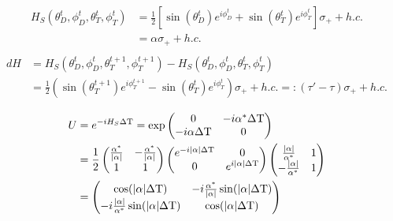 \begin{align*}
	H_S(\theta_D^t, \phi_D^t, \theta_T^t, \phi_T^t) & = \frac{1}{2} \left[\sin(\theta_D^t) e^{i\phi_D^t} + \sin(\theta_T^t) e^{i\phi_T^t}\right] \sigma_{+} + h.c. \\
	& = \alpha \sigma_{+} + h.c. \\
\end{align*}
\begin{align*}
	dH & = H_S(\theta_D^t, \phi_D^t, \theta_T^{t+1}, \phi_T^{t+1}) - H_S(\theta_D^t, \phi_D^t, \theta_T^t, \phi_T^t) \\
	& = \frac{1}{2}(\sin(\theta_T^{t+1})e^{i\phi_T^{t+1}} - \sin(\theta_T^t)e^{i\phi_T^t}) \sigma_{+} + h.c. =: (\tau' - \tau) \sigma_{+} + h.c. \\
\end{align*}
\begin{align*}
	U & = e^{-iH_S \Delta \mathrm{T}} = 
	\exp \begin{pmatrix}
	0 & -i\alpha^* \Delta \mathrm{T} \\
	-i \alpha \Delta \mathrm{T} & 0 \\
	\end{pmatrix}\\
	& = 
	\frac{1}{2} \begin{pmatrix}
	\frac{\alpha^*}{\abs{\alpha}} & -\frac{\alpha^*}{\abs{\alpha}} \\
	1 & 1 \\
	\end{pmatrix}
	\begin{pmatrix}
	e^{-i\abs{\alpha} \Delta \mathrm{T}} & 0 \\
	0 & e^{i\abs{\alpha} \Delta \mathrm{T}} \\
	\end{pmatrix}
	\begin{pmatrix}
	\frac{\abs{\alpha}}{\alpha^*} & 1 \\
	-\frac{\abs{\alpha}}{\alpha^*} & 1 \\
	\end{pmatrix} \\
	& = \begin{pmatrix}
	\cos(\abs{\alpha}\Delta \mathrm{T}) & -i\frac{\alpha^*}{\abs{\alpha}} \sin(\abs{\alpha}\Delta \mathrm{T}) \\
	-i\frac{\abs{\alpha}}{\alpha^*} \sin(\abs{\alpha}\Delta \mathrm{T}) & \cos(\abs{\alpha} \Delta \mathrm{T}) \\
	\end{pmatrix} \\
\end{align*}
